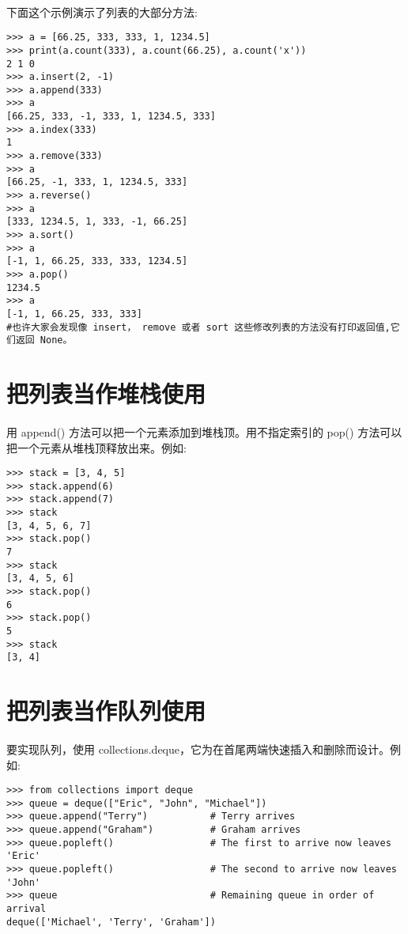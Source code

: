 \documentclass{article}
\begin{document}
\begin{CJK}{UTF8}{gbsn}
\paragraph{}
下面这个示例演示了列表的大部分方法:
\begin{verbatim}
>>> a = [66.25, 333, 333, 1, 1234.5]
>>> print(a.count(333), a.count(66.25), a.count('x'))
2 1 0
>>> a.insert(2, -1)
>>> a.append(333)
>>> a
[66.25, 333, -1, 333, 1, 1234.5, 333]
>>> a.index(333)
1
>>> a.remove(333)
>>> a
[66.25, -1, 333, 1, 1234.5, 333]
>>> a.reverse()
>>> a
[333, 1234.5, 1, 333, -1, 66.25]
>>> a.sort()
>>> a
[-1, 1, 66.25, 333, 333, 1234.5]
>>> a.pop()
1234.5
>>> a
[-1, 1, 66.25, 333, 333]
#也许大家会发现像 insert， remove 或者 sort 这些修改列表的方法没有打印返回值,它们返回 None。
\end{verbatim}
\section{把列表当作堆栈使用}
\paragraph{}
用 append() 方法可以把一个元素添加到堆栈顶。用不指定索引的 pop() 方法可以把一个元素从堆栈顶释放出来。例如:
\begin{verbatim}
>>> stack = [3, 4, 5]
>>> stack.append(6)
>>> stack.append(7)
>>> stack
[3, 4, 5, 6, 7]
>>> stack.pop()
7
>>> stack
[3, 4, 5, 6]
>>> stack.pop()
6
>>> stack.pop()
5
>>> stack
[3, 4]
\end{verbatim}
\section{把列表当作队列使用}
\paragraph{}
要实现队列，使用 collections.deque，它为在首尾两端快速插入和删除而设计。例如:
\begin{verbatim}
>>> from collections import deque
>>> queue = deque(["Eric", "John", "Michael"])
>>> queue.append("Terry")           # Terry arrives
>>> queue.append("Graham")          # Graham arrives
>>> queue.popleft()                 # The first to arrive now leaves
'Eric'
>>> queue.popleft()                 # The second to arrive now leaves
'John'
>>> queue                           # Remaining queue in order of arrival
deque(['Michael', 'Terry', 'Graham'])
\end{verbatim}

\end{CJK}
\end{document}

